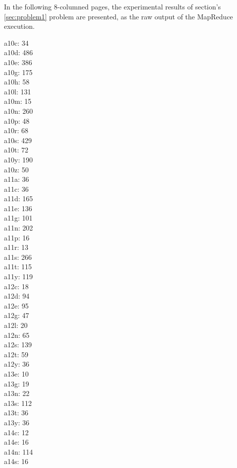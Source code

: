 In the following 8-columned pages, the experimental results of section's  \ref{sec:problem1} problem are presented,
as the raw output of the MapReduce execution.

\begin{multicols}{8}
  \noindent
  a10c: 34
  \\ a10d: 486
  \\ a10e: 386
  \\ a10g: 175
  \\ a10h: 58
  \\ a10l: 131
  \\ a10m: 15
  \\ a10n: 260
  \\ a10p: 48
  \\ a10r: 68
  \\ a10s: 429
  \\ a10t: 72
  \\ a10y: 190
  \\ a10z: 50
  \\ a11a: 36
  \\ a11c: 36
  \\ a11d: 165
  \\ a11e: 136
  \\ a11g: 101
  \\ a11n: 202
  \\ a11p: 16
  \\ a11r: 13
  \\ a11s: 266
  \\ a11t: 115
  \\ a11y: 119
  \\ a12c: 18
  \\ a12d: 94
  \\ a12e: 95
  \\ a12g: 47
  \\ a12l: 20
  \\ a12n: 65
  \\ a12s: 139
  \\ a12t: 59
  \\ a12y: 36
  \\ a13e: 10
  \\ a13g: 19
  \\ a13n: 22
  \\ a13s: 112
  \\ a13t: 36
  \\ a13y: 36
  \\ a14c: 12
  \\ a14e: 16
  \\ a14n: 114
  \\ a14s: 16

\end{multicols}

